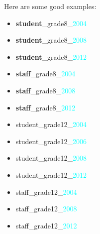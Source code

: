 \documentclass[11pt]{article}
\begin{document}
Here are some good examples:
\begin{itemize}[label=]
	\item   {\textcolor{uscred}{\textbf{student}}}\_grade8\_{\textcolor{cyan}{2004}}
	\item   {\textcolor{uscred}{\textbf{student}}}\_grade8\_{\textcolor{cyan}{2008}}
	\item   {\textcolor{uscred}{\textbf{student}}}\_grade8\_{\textcolor{cyan}{2012}}
	\item   {\textcolor{uscgold}{\textbf{staff}}}\_grade8\_{\textcolor{cyan}{2004}}
	\item   {\textcolor{uscgold}{\textbf{staff}}}\_grade8\_{\textcolor{cyan}{2008}}
	\item   {\textcolor{uscgold}{\textbf{staff}}}\_grade8\_{\textcolor{cyan}{2012}}
	\item   {\textcolor{uscred}{\textsf{student}}}\_grade12\_{\textcolor{cyan}{2004}}
	\item   {\textcolor{uscred}{\textsf{student}}}\_grade12\_{\textcolor{cyan}{2006}}
	\item   {\textcolor{uscred}{\textsf{student}}}\_grade12\_{\textcolor{cyan}{2008}}
	\item   {\textcolor{uscred}{\textsf{student}}}\_grade12\_{\textcolor{cyan}{2012}}
	\item   {\textcolor{uscgold}{\textsf{staff}}}\_grade12\_{\textcolor{cyan}{2004}}
	\item   {\textcolor{uscgold}{\textsf{staff}}}\_grade12\_{\textcolor{cyan}{2008}}
	\item   {\textcolor{uscgold}{\textsf{staff}}}\_grade12\_{\textcolor{cyan}{2012}}
\end{itemize}
\end{document}
